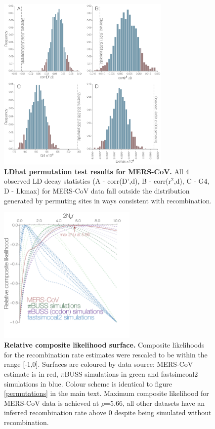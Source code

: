 \documentclass[11pt,oneside,letterpaper]{article}
\begin{document}
\begin{figure}[h]
	\centering	
	\includegraphics[width=0.75\textwidth]{figures/supp_MERS_permutations.png}
	\caption{\textbf{LDhat permutation test results for MERS-CoV.}
All 4 observed LD decay statistics (A - corr(D',d), B - corr(r$^{2}$,d), C - G4, D - Lkmax) for MERS-CoV data fall outside the distribution generated by permuting sites in ways consistent with recombination.}
	\label{MERS_permutations}
\end{figure}

\begin{figure}[h]
	\centering	
	\includegraphics[width=0.6\textwidth]{figures/supp_MERS_compositeLikelihoods.png}
	\caption{\textbf{Relative composite likelihood surface.}
Composite likelihoods for the recombination rate estimates were rescaled to be within the range [-1,0].
Surfaces are coloured by data source: MERS-CoV estimate is in red, $\pi$BUSS simulations in green and fastsimcoal2 simulations in blue.
Colour scheme is identical to figure \ref{permutations} in the main text.
Maximum composite likelihood for MERS-CoV data is achieved at $\rho$=5.66, all other datasets have an inferred recombination rate above 0 despite being simulated without recombination.}
	\label{compLikelihoods}
\end{figure}
\end{document}
